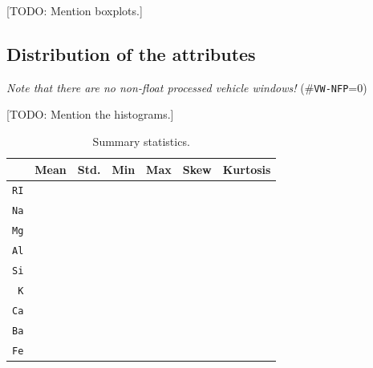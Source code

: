 \documentclass[dtu]{dtuarticle}
\newcommand{\todo}[1]{\color{red}[TODO: #1]\color{black}}
\begin{document}
	\todo{Mention boxplots.}

	\subsection{Distribution of the attributes}
	\label{section:distribution}

	\textit{Note that there are no non-float processed vehicle windows!} (\#\texttt{VW-NFP}=0)

	\todo{Mention the histograms.}

	\begin{table}[h!]
		\centering
		\begin{subtable}{0.6\textwidth}
			\begin{tabular}{r | *{6}{| r}}
				& \textbf{Mean} & \textbf{Std.} & \textbf{Min} & \textbf{Max} & \textbf{Skew} & \textbf{Kurtosis} \\ \hline\hline
				\texttt{RI} &               &               &              &              &               &                   \\ \hline
				\texttt{Na} &               &               &              &              &               &                   \\ \hline
				\texttt{Mg} &               &               &              &              &               &                   \\ \hline
				\texttt{Al} &               &               &              &              &               &                   \\ \hline
				\texttt{Si} &               &               &              &              &               &                   \\ \hline
				\texttt{K} &               &               &              &              &               &                   \\ \hline
				\texttt{Ca} &               &               &              &              &               &                   \\ \hline
				\texttt{Ba} &               &               &              &              &               &                   \\ \hline
				\texttt{Fe} &               &               &              &              &               &
			\end{tabular}
			\caption{Summary statistics.}
			\label{table:summary-stats}
		\end{subtable}
		\hspace*{0\textwidth}
		\begin{subtable}{.3\textwidth}

\end{subtable}
\end{table}
\end{document}

